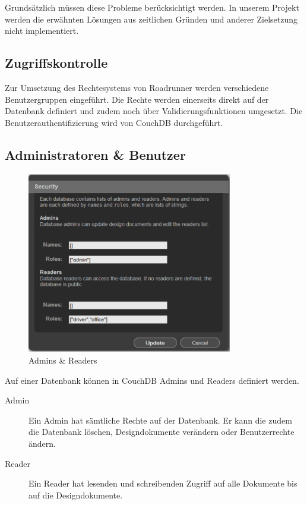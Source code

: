 Grundsätzlich müssen diese Probleme berücksichtigt werden. In unserem
Projekt werden die erwähnten Lösungen aus zeitlichen Gründen und anderer
Zielsetzung nicht implementiert.

\subsection{Zugriffskontrolle}

Zur Umsetzung des Rechtesystems von Roadrunner werden verschiedene Benutzergruppen eingeführt. Die Rechte werden einerseits direkt auf der Datenbank definiert und zudem noch über Validierungsfunktionen umgesetzt. Die Benutzerauthentifizierung wird von CouchDB durchgeführt.

\subsection{Administratoren \& Benutzer}

\begin{figure}
	\centering
		\includegraphics[width=0.8\textwidth]{files/pdf/security.pdf}
	\caption{Admins \& Readers}
	\label{fig:security}
\end{figure}

Auf einer Datenbank können in CouchDB Admins und Readers definiert werden. 
\begin{description}
\item[Admin] Ein Admin hat sämtliche Rechte auf der Datenbank. Er kann die zudem die Datenbank löschen, Designdokumente verändern oder Benutzerrechte ändern.
\item[Reader] Ein Reader hat lesenden und schreibenden Zugriff auf alle Dokumente bis auf die Designdokumente.
\end{description}

